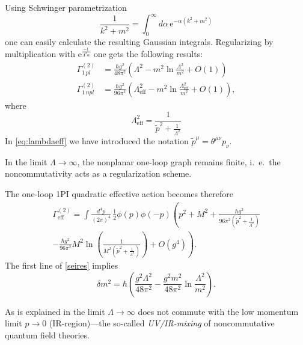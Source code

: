 \documentclass[a4paper,12pt]{article}
\begin{document}
Using Schwinger parametrization 
\begin{equation}
  \frac{1}{k^2+m^2} = \int_0^{\infty} d\alpha \, 
    \mathrm{e}^{-\alpha (k^2+m^2)}
\end{equation}
one can easily calculate the resulting Gaussian integrals. Regularizing by multiplication with $\mathrm{e}^{\frac{-1}{\Lambda^2 \alpha}}$ one gets the following results:
\begin{align}
  \label{seires}
  \Gamma^{(2)}_{1 \, pl} &= \frac{\hbar g^2}{48 \pi^2} \left( \Lambda^2 - m^2 
    \ln \frac{\Lambda^2}{m^2} + O(1) \right) \nonumber \\
  \Gamma^{(2)}_{1 \, npl} &= \frac{\hbar g^2}{96 \pi^2} \left( \Lambda_
    {\mathrm{eff}}^2 - m^2 \ln \frac{\Lambda_{\mathrm{eff}}^2}{m^2} + O(1) 
      \right),
\end{align}
where
\begin{equation}
  \label{eq:lambdaeff}
  \Lambda_{\mathrm{eff}}^2 = \frac{1}{\tilde{p}^2 + \frac{1}{\Lambda^2}}
\end{equation}
In \eqref{eq:lambdaeff} we have introduced the notation $\tilde{p}^\mu = \theta^{\mu\nu} p_\nu$.

In the limit $\Lambda \rightarrow \infty$, the nonplanar one-loop graph remains finite, i.~e.\ the noncommutativity acts as a regularization scheme.

The one-loop 1PI quadratic effective action becomes therefore
\begin{multline}
  \label{gammaeff}
  \Gamma^{(2)}_{\mathrm{eff}} = \int \frac{d^4 \! p}{(2 \pi)^4} \, \frac{1}{2}
    \phi(p) \phi(-p) 
      \left(p^2 + M^2 + \frac{\hbar g^2}{96 \pi^2 (\tilde{p}^2 + \frac{1}
        {\Lambda^2})} \right. \\
    - \left. \frac{\hbar g^2}{96 \pi^2} M^2 \ln \left( \frac{1}
     {M^2(\tilde{p}^2 + \frac{1}{\Lambda^2})} \right) + O(g^4) \right). 
\end{multline}
The first line of \eqref{seires} implies 
\begin{equation}
  \delta m^2 =  \hbar \left( \frac{g^2 \Lambda^2}{48 \pi^2} - \frac{g^2 m^2}
    {48 \pi^2} \ln \frac{\Lambda^2}{m^2} \right).
\end{equation}

As is explained in \cite{Minwalla:1999px} the limit $\Lambda \rightarrow \infty$ does not commute with the low momentum limit $p \rightarrow 0$ (IR-region)---the so-called \emph{UV/IR-mixing} of noncommutative quantum field theories.
\end{document}
